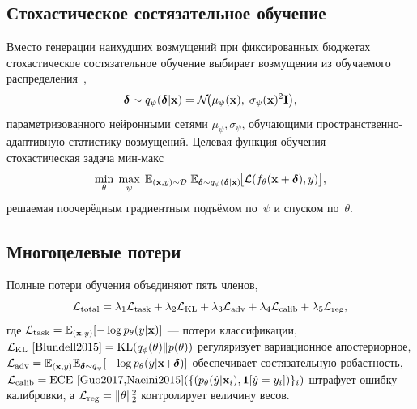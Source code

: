 \subsection{Стохастическое состязательное обучение}

Вместо генерации наихудших возмущений при фиксированных бюджетах стохастическое состязательное обучение выбирает возмущения из обучаемого распределения~\cite{Madry2018,Zhang2019trades,Shafahi2019},
\begin{equation}
\boldsymbol{\delta}\sim q_\psi(\boldsymbol{\delta}|\mathbf{x})
= \mathcal{N}\!\bigl(\mu_\psi(\mathbf{x}),\;\sigma_\psi(\mathbf{x})^2\mathbf{I}\bigr),
\label{eq:stoch_pert_dist}
\end{equation}
параметризованного нейронными сетями $\mu_\psi,\sigma_\psi$, обучающими пространственно-адаптивную статистику возмущений. Целевая функция обучения --- стохастическая задача мин-макс
\begin{equation}
\min_\theta\;\max_\psi\;
\mathbb{E}_{(\mathbf{x},y)\sim\mathcal{D}}\;
\mathbb{E}_{\boldsymbol{\delta}\sim q_\psi(\boldsymbol{\delta}|\mathbf{x})}\!
\bigl[\mathcal{L}(f_\theta(\mathbf{x}+\boldsymbol{\delta}),y)\bigr],
\label{eq:stoch_adv_obj}
\end{equation}
решаемая поочерёдным градиентным подъёмом по~$\psi$ и спуском по~$\theta$.

\subsection{Многоцелевые потери}

Полные потери обучения объединяют пять членов,
\begin{equation}
\mathcal{L}_{\mathrm{total}}
= \lambda_1\mathcal{L}_{\mathrm{task}}
+ \lambda_2\mathcal{L}_{\mathrm{KL}}
+ \lambda_3\mathcal{L}_{\mathrm{adv}}
+ \lambda_4\mathcal{L}_{\mathrm{calib}}
+ \lambda_5\mathcal{L}_{\mathrm{reg}},
\label{eq:stoch_total_loss}
\end{equation}
где $\mathcal{L}_{\mathrm{task}}=\mathbb{E}_{(\mathbf{x},y)}[-\log p_\theta(y|\mathbf{x})]$ --- потери классификации, $\mathcal{L}_{\mathrm{KL}}~\cite{Blundell2015}=\mathrm{KL}(q_\phi(\theta)\|p(\theta))$ регуляризует вариационное апостериорное, $\mathcal{L}_{\mathrm{adv}}=\mathbb{E}_{(\mathbf{x},y)}\mathbb{E}_{\boldsymbol{\delta}\sim q_\psi}[-\log p_\theta(y|\mathbf{x}{+}\boldsymbol{\delta})]$ обеспечивает состязательную робастность, $\mathcal{L}_{\mathrm{calib}}=\mathrm{ECE}~\cite{Guo2017,Naeini2015}(\{(p_\theta(\hat{y}|\mathbf{x}_i),\mathbf{1}[\hat{y}=y_i])\}_i)$ штрафует ошибку калибровки, а $\mathcal{L}_{\mathrm{reg}}=\|\theta\|_2^2$ контролирует величину весов.

